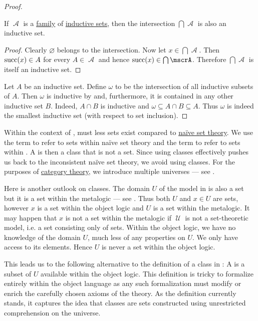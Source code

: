 \begin{proof}

  \begin{lemma}\label{thm:intersection_of_inductive_sets}
    If \( \mscrA \) is a \hyperref[rem:family_of_sets]{family} of \hyperref[def:inductive_set]{inductive sets}, then the intersection \( \bigcap \mscrA \) is also an inductive set.
  \end{lemma}
  \begin{proof}
    Clearly \( \varnothing \) belongs to the intersection. Now let \( x \in \bigcap \mscrA \). Then \( \operatorname{succ}(x) \in A \) for every \( A \in \mscrA \) and hence \( \op{succ}(x) \in \bigcap \mscrA \). Therefore \( \bigcap \mscrA \) is itself an inductive set.
  \end{proof}

  Let \( A \) be an inductive set. Define \( \omega \) to be the intersection of all inductive subsets of \( A \). Then \( \omega \) is inductive by  and, furthermore, it is contained in any other inductive set \( B \). Indeed, \( A \cap B \) is inductive and \( \omega \subseteq A \cap B \subseteq A \). Thus \( \omega \) is indeed the smallest inductive set (with respect to set inclusion).
\end{proof}

\begin{remark}\label{rem:proper_class}
  Within the context of \hyperref[def:zfc]{}, must less sets exist compared to \hyperref[def:naive_set_theory]{na\"ive set theory}. We use the term  to refer to sets within na\"ive set theory and the term  to refer to sets within . A  is then a class that is not a set. Since using classes effectively pushes us back to the inconsistent na\"ive set theory, we avoid using classes. For the purposes of \hyperref[sec:category_theory]{category theory}, we introduce multiple universes --- see .

  Here is another outlook on classes. The domain \( U \) of the model in  is also a set but it is a set within the metalogic --- see . Thus both \( U \) and \( x \in U \) are sets, however \( x \) is a set within the object logic and \( U \) is a set within the metalogic. It may happen that \( x \) is not a set within the metalogic if \( \mscrU \) is not a set-theoretic model, i.e. a set consisting only of sets. Within the object logic, we have no knowledge of the domain \( U \), much less of any properties on \( U \). We only have access to its elements. Hence \( U \) is never a set within the object logic.

  This leads us to the following alternative to the definition of a class in : A  is a subset of \( U \) available within the object logic. This definition is tricky to formalize entirely within the object language as any such formalization must modify or enrich the carefully chosen axioms of the theory. As the definition currently stands, it captures the idea that classes are sets constructed using unrestricted comprehension on the universe.
\end{remark}
